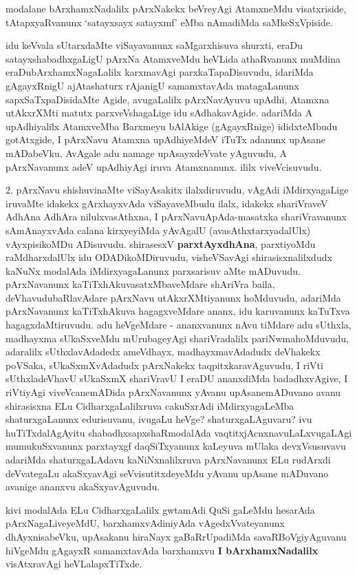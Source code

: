 \centerline{}

\centerline{}

\begin{artha}
modalane bArxhamxNadalilx pArxNakekx beVreyAgi AtamxneMdu
visatxriside, tAtapxyaRvanunx `satayxsayx satayxmf' eMba nAmadiMda
saMkeSxVpiside. 

idu keVvala sUtarxdaMte viSayavanunx saMgarxhisuva shurxti, eraDu
satayxshabadhxgaLigU pArxNa AtamxveMdu heVLida athaRvanunx muMdina
eraDubArxhamxNagaLalilx karxmavAgi parxkaTapaDisuvudu, idariMda
gAgayxRnigU ajAtashaturx rAjanigU samamxtavAda matagaLanunx
sapxSaTxpaDisidaMte Agide, avugaLalilx pArxNavAyuvu upAdhi, Atamxna
utAkxrXMti matutx parxveVshagaLige idu sAdhakavAgide. adariMda A
upAdhiyalilx AtamxveMba Barxmeyu bAlAkige (gAgayxRnige) ididxteMbudu
gotAtxgide, I pArxNavu Atamxna upAdhiyeMdeV iTuTx adanunx upAsane
mADabeVku, AvAgale adu namage upAsayxdeVvate yAguvudu, A pArxNavanunx
adeV upAdhiyAgi iruva Atamxnanunx. ililx viveVcisuvudu.
\end{artha}


\centerline{}

\begin{artha}
2. pArxNavu shishuvinaMte viSayAsakitx ilalxdiruvudu, vAgAdi
iMdirxyagaLige iruvaMte idakekx gArxhayxvAda viSayaveMbudu ilalx,
idakekx shariVraveV AdhAna  AdhAra nilulxvasAthxna, I pArxNavuApAda-masatxka shariVravanunx sAmAnayxvAda calana kirxyeyiMda
yAvAgalU (avasAthxtarxyadalUlx) vAyxpisikoMDu ADisuvudu. shirasesxV
\textbf{parxtAyxdhAna}, parxtiyoMdu raMdharxdalUlx idu ODADikoMDiruvudu,
visheVSavAgi shirasisxnalilxdudx kaNuNx modalAda iMdirxyagaLanunx
parxsarisuv	aMte mADuvudu. pArxNavanunx kaTiTxhAkuvasatxMbaveMdare
shAriVra baila, deVhavudubaRlavAdare  pArxNavu utAkxrXMtiyanunx
hoMduvudu, adariMda pArxNavanunx kaTiTxhAkuva hagagxveMdare ananx, idu
karuvanunx kaTuTxva hagagxdaMtiruvudu. adu heVgeMdare - ananxvanunx
nAvu tiMdare adu sUthxla, madhayxma sUkaSxveMdu mUrubageyAgi
shariVradalilx pariNwmahoMduvudu, adaralilx sUthxlavAdadedx ameVdhayx,
madhayxmavAdadudx deVhakekx poVSaka, sUkaSxmXvAdadudx pArxNakekx
taqpitxkaravAguvudu, I riVti sUthxladeVhavU  sUkaSxmX shariVravU I
eraDU ananxdiMda badadhxvAgive, I riVtiyAgi viveVcanemADida
pArxNavanunx yAvanu upAsanemADuvano avanu shirasisxna ELu
CidharxgaLalilxruva cakuSxrAdi iMdirxyagaLeMba shaturxgaLanunx
edurisuvanu, ivugaLu heVge? shaturxgaLAguvaru? ivu huTiTxdalAgAyitu
shabadhxsapxshaRmodalAda vaqtitxjAcnxnavuLaLxvugaLAgi  mumukuSxvanunx
parxtayxgf daqSiTxyanunx kaLeyuva mUlaka devxVsusuvavu adariMda
shaturxgaLAdavu kaNiNxnalilxruva pArxNavanunx ELu rudArxdi deVvategaLu
akaSxyavAgi  seVvisutitxdeyeMdu yAvanu upAsane mADuvano avanige
ananxvu akaSxyavAguvudu.

kivi modalAda ELu CidharxgaLalilx gwtamAdi QuSi gaLeMdu hesarAda pArxNagaLiveyeMdU, barxhamxvAdiniyAda
vAgedxVvateyanunx dhAyxnisabeVku, upAsakanu hiraNayx gaBaRrUpadiMda
savaRBoVgiyAguvanu hiVgeMdu gAgayxR samamxtavAda barxhamxvu \textbf{I bArxhamxNadalilx} 
visAtxravAgi heVLalapxTiTxde.
\end{artha}

